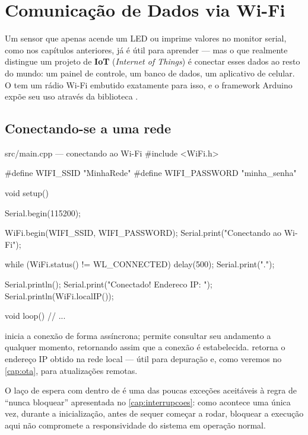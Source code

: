 \chapter{Comunicação de Dados via Wi-Fi}
\label{cap:wifi}

Um sensor que apenas acende um LED ou imprime valores no monitor serial, como nos capítulos anteriores, já é útil para aprender — mas o que realmente distingue um projeto de \textbf{IoT} (\emph{Internet of Things}) é conectar esses dados ao resto do mundo: um painel de controle, um banco de dados, um aplicativo de celular. O \ESP{} tem um rádio Wi-Fi embutido exatamente para isso, e o framework Arduino expõe seu uso através da biblioteca .

\section{Conectando-se a uma rede}

\begin{codigoc}{src/main.cpp — conectando ao Wi-Fi}
#include <WiFi.h>

#define WIFI_SSID     "MinhaRede"
#define WIFI_PASSWORD "minha_senha"

void setup() {
    Serial.begin(115200);

    WiFi.begin(WIFI_SSID, WIFI_PASSWORD);
    Serial.print("Conectando ao Wi-Fi");

    while (WiFi.status() != WL_CONNECTED) {
        delay(500);
        Serial.print(".");
    }

    Serial.println();
    Serial.print("Conectado! Endereco IP: ");
    Serial.println(WiFi.localIP());
}

void loop() {
    // ...
}
\end{codigoc}

 inicia a conexão de forma assíncrona;  permite consultar seu andamento a qualquer momento, retornando  assim que a conexão é estabelecida.  retorna o endereço IP obtido na rede local — útil para depuração e, como veremos no \cref{cap:ota}, para atualizações remotas.

\begin{nota}
O laço de espera com  dentro de  é uma das poucas exceções aceitáveis à regra de ``nunca bloquear'' apresentada no \cref{cap:interrupcoes}: como acontece uma única vez, durante a inicialização, antes de  sequer começar a rodar, bloquear a execução aqui não compromete a responsividade do sistema em operação normal.
\end{nota}

